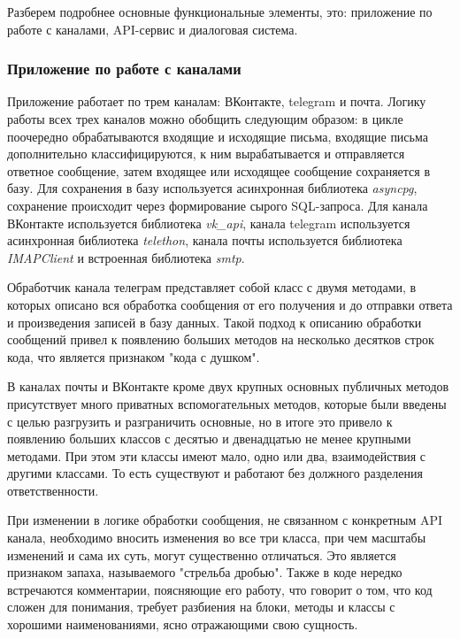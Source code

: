    Разберем подробнее основные функциональные элементы, это:
    приложение по работе с каналами, API-сервис и диалоговая система.
    
    \subsubsection*{Приложение по работе с каналами}
    Приложение работает по трем каналам: ВКонтакте, telegram и почта. Логику работы всех трех каналов можно обобщить
    следующим образом: в цикле поочередно обрабатываются входящие  и исходящие письма, входящие письма дополнительно
    классифицируются, к ним вырабатывается и отправляется ответное сообщение, затем входящее или исходящее сообщение
    сохраняется в базу. Для сохранения в базу используется асинхронная библиотека \textit{asyncpg},
    сохранение происходит через формирование сырого SQL-запроса.
    Для канала ВКонтакте используется библиотека \textit{vk\_api},
    канала telegram используется асинхронная библиотека \textit{telethon},
    канала почты используется библиотека \textit{IMAPClient}\cite{docs.imap} 
    и встроенная библиотека \textit{smtp}.

    Обработчик канала телеграм представляет собой класс с двумя методами,
    в которых описано вся обработка сообщения от его получения и до отправки ответа
    и произведения записей в базу данных. Такой подход к описанию обработки сообщений
    привел к появлению больших методов на несколько десятков строк кода, что является
    признаком "кода с душком".

    В каналах почты и ВКонтакте кроме двух крупных основных публичных методов
    присутствует много приватных вспомогательных методов, которые были введены с
    целью разгрузить и разграничить основные, но в итоге это привело к появлению
    больших классов с десятью и двенадцатью не менее крупными методами.
    При этом эти классы имеют мало, одно или два, взаимодействия с другими классами.
    То есть существуют и работают без должного разделения ответственности.

    При изменении в логике обработки сообщения, не связанном с конкретным API канала,
    необходимо вносить изменения во все три класса, при чем масштабы изменений и
    сама их суть, могут существенно отличаться.
    Это является признаком запаха, называемого "стрельба дробью".
    Также в коде нередко встречаются комментарии, поясняющие его работу, что говорит
    о том, что код сложен для понимания, требует разбиения на блоки, методы и классы
    с хорошими наименованиями, ясно отражающими свою сущность. \cite{refactoring.fowler}

